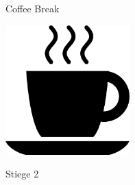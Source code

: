 \documentclass[a4paper]{article}
\begin{document}
\printGenericVSLHeader
\begin{center}
    \vspace{-2cm}
\begin{vsltext}{3cm}{4cm}
    Coffee Break

    \vspace{0.5cm}

    \includegraphics[height=5cm, keepaspectratio=true]{coffeecup.png}

    \vspace{0.5cm}

    Stiege 2

\end{vsltext}

\end{center}
\end{document}
